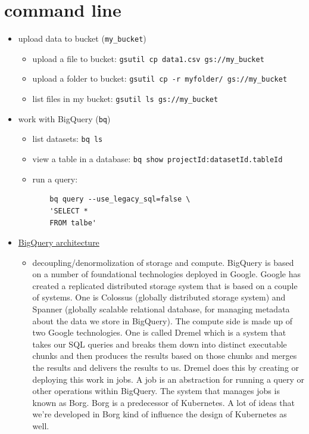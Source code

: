 \documentclass{article}
\begin{document}
\section{command line}
\begin{itemize}
\item upload data to bucket (\verb|my_bucket|)
	\begin{itemize}
	\item upload a file to bucket: \verb|gsutil cp data1.csv gs://my_bucket|
	\item upload a folder to bucket: \verb|gsutil cp -r myfolder/ gs://my_bucket|
	\item list files in my bucket: \verb|gsutil ls gs://my_bucket|
	\end{itemize}
\item work with BigQuery (\verb|bq|)
	\begin{itemize}
	\item list datasets: \verb|bq ls|
	\item view a table in a database: \verb|bq show projectId:datasetId.tableId|
	\item run a query:
	\begin{verbatim}
	bq query --use_legacy_sql=false \
	'SELECT *
	FROM talbe'
	\end{verbatim}
	\end{itemize}
\item \href{https://1drv.ms/v/s!An3MvLGBA7qWjowPwVd8RAInk7_tDg?e=axGPRB}{BigQuery architecture}
	\begin{itemize}
	\item decoupling/denormolization of storage and compute. 
	BigQuery is based on a number of foundational technologies deployed in Google. Google has created a replicated distributed storage system that is based on a couple of systems. One is Colossus (globally distributed storage system) and Spanner (globally scalable relational database, for managing metadata about the data we store in BigQuery). The compute side is made up of two Google technologies. One is called Dremel which is a system that takes our SQL queries and breaks them down into distinct executable chunks and then produces the results based on those chunks and merges the results and delivers the results to us. Dremel does this by creating or deploying this work in jobs. A job is an abstraction for running a query or other operations within BigQuery. The system that manages jobs is known as Borg. Borg is a predecessor of Kubernetes. A lot of ideas that we're developed in Borg kind of influence the design of Kubernetes as well. \\


\end{itemize}
\end{itemize}
\end{document}

